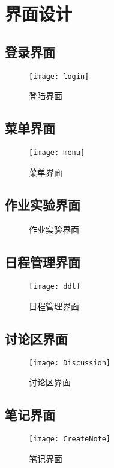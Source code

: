 \chapter{界面设计}
\section{登录界面}
\begin{figure}[H]
\centering
\texttt{[image: login]}
\caption{登陆界面}
\end{figure}
\section{菜单界面}
\begin{figure}[H]
\centering
\texttt{[image: menu]}
\caption{菜单界面}
\end{figure}
\section{作业实验界面}
\begin{figure}[H]
\centering
{}
\caption{作业实验界面}
\end{figure}
\section{日程管理界面}
\begin{figure}[H]
\centering
\texttt{[image: ddl]}
\caption{日程管理界面}
\end{figure}
\section{讨论区界面}
\begin{figure}[H]
\centering
\texttt{[image: Discussion]}
\caption{讨论区界面}
\end{figure}
\section{笔记界面}
\begin{figure}[H]
\centering
\texttt{[image: CreateNote]}
\caption{笔记界面}
\end{figure}
